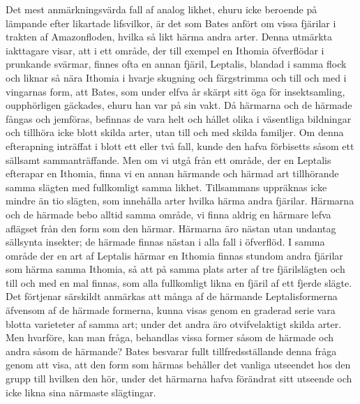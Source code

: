 Det mest anmärkningsvärda fall af analog likhet, ehuru icke beroende på lämpande efter likartade lifsvilkor, är det som Bates anfört om vissa fjärilar i trakten af Amazonfloden, hvilka så likt härma andra arter. Denna utmärkta iakttagare visar, att i ett område, der till exempel en Ithomia öfverflödar i prunkande svärmar, finnes ofta en annan fjäril, Leptalis, blandad i samma flock och liknar så nära Ithomia i hvarje skugning och färgstrimma och till och med i vingarnas form, att Bates, som under elfva år skärpt sitt öga för insektsamling, oupphörligen gäckades, ehuru han var på sin vakt. Då härmarna och de härmade fångas och jemföras, befinnas de vara helt och hållet olika i väsentliga bildningar och tillhöra icke blott skilda arter, utan till och med skilda familjer. Om denna efterapning inträffat i blott ett eller två fall, kunde den hafva förbisetts såsom ett sällsamt sammanträffande. Men om vi utgå från ett område, der en Leptalis efterapar en Ithomia, finna vi en annan härmande och härmad art tillhörande samma slägten med fullkomligt samma likhet. Tillsammans uppräknas icke mindre än tio slägten, som innehålla arter hvilka härma andra fjärilar. Härmarna och de härmade bebo alltid samma område, vi finna aldrig en härmare lefva aflägset från den form som den härmar. Härmarna äro nästan utan undantag sällsynta insekter; de härmade finnas nästan i alla fall i öfverflöd. I samma område der en art af Leptalis härmar en Ithomia finnas stundom andra fjärilar som härma samma Ithomia, så att på samma plats arter af tre fjärilslägten och till och med en mal finnas, som alla fullkomligt likna en fjäril af ett fjerde slägte. Det förtjenar särskildt anmärkas att många af de härmande Leptalisformerna äfvensom af de härmade formerna, kunna visas genom en graderad serie vara blotta varieteter af samma art; under det andra äro otvifvelaktigt skilda arter. Men hvarföre, kan man fråga, behandlas vissa former såsom de härmade och andra såsom de härmande? Bates besvarar fullt tillfredsställande denna fråga genom att visa, att den form som härmas behåller det vanliga utseendet hos den grupp till hvilken den hör, under det härmarna hafva förändrat sitt utseende och icke likna sina närmaste slägtingar.

